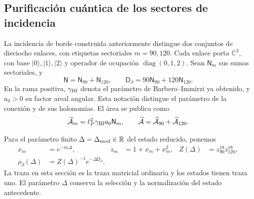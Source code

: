 \subsection{Purificación cuántica de los sectores de incidencia}
\label{vii:vii:subsec:purificacion-sectorial}

La incidencia de borde construida anteriormente distingue dos conjuntos
de dieciocho enlaces, con etiquetas sectoriales \(m=90,120\). Cada enlace
porta \(\mathbb C^3\), con base \(|0\rangle,|1\rangle,|2\rangle\)
y operador de ocupación \(\operatorname{diag}(0,1,2)\). Sean
\(\mathsf N_m\) sus sumas sectoriales, y
\begin{equation}
 \mathsf N=\mathsf N_{90}+\mathsf N_{120},\qquad
 \mathsf D_\partial=90\mathsf N_{90}+120\mathsf N_{120}.
 \label{vii:vii:eq:ocupaciones-sectoriales}
\end{equation}
En la rama positiva, \(\gamma_{\rm BI}\) denota el parámetro de
Barbero--Immirzi ya obtenido, y \(a_0>0\) su factor areal angular.
Esta notación distingue el parámetro de la conexión y de sus holonomías.
El área se publica como
\begin{equation}
 \widehat{\mathcal A}_m=\ell_P^2\gamma_{\rm BI}a_0\mathsf N_m,
 \qquad
 \widehat{\mathcal A}=\widehat{\mathcal A}_{90}
                         +\widehat{\mathcal A}_{120}.
 \label{vii:vii:eq:area-sectores}
\end{equation}

Para el parámetro finito \(\Delta=\Delta_{\rm mod}\in\mathbb R\) del
estado reducido, ponemos
\begin{align}
 x_m&=e^{-m\Delta},& z_m&=1+x_m+x_m^2,&
 Z(\Delta)&=z_{90}^{18}z_{120}^{18},\\
 \rho_\partial(\Delta)&=Z(\Delta)^{-1}e^{-\Delta\mathsf D_\partial}.
 \label{vii:vii:eq:estado-sectorial}
\end{align}
La traza en esta sección es la traza matricial ordinaria y los estados
tienen traza uno. El parámetro \(\Delta\) conserva la selección y la
normalización del estado antecedente.

